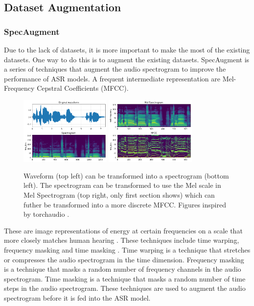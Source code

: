 \documentclass[letterpaper, 12pt]{article}
\begin{document}
\begin{multicols*}{2}
\subsection{Dataset Augmentation}
\subsubsection{SpecAugment}
Due to the lack of datasets, it is more important to make the most of the existing datasets. One
way to do this is to augment the existing datasets. SpecAugment is a series of techniques that
augment the audio spectrogram to improve the performance of ASR models. A frequent intermediate
representation are Mel-Frequency Cepstral Coefficients (MFCC).

\begin{figure}
    \centering
    \includegraphics[width=0.4\textwidth]{assets/waveform-to-spectrogram-sing.png}
    \includegraphics[width=0.4\textwidth]{assets/melspectrogram-mfcc.png}
    \caption{Waveform (top left) can be transformed into a spectrogram (bottom left).
    The spectrogram can be transformed to use the Mel scale in Mel Spectrogram (top right,
    only first section shows) which can futher be transformed into a more discrete MFCC.
    Figures inspired by torchaudio \citep{torchAudioFigures}.}
    \label{fig:MFCC}
\end{figure}

These are image representations of
energy at certain frequencies on a scale that more closely matches human hearing \citep{MFCC}.
These techniques include time warping, frequency masking and time masking \citep{SpecAugment}.
Time warping is a technique that stretches or compresses the audio spectrogram in the time
dimension. Frequency masking is a technique that masks a random number of frequency channels in
the audio spectrogram. Time masking is a technique that masks a random number of time steps
in the audio spectrogram. These techniques are used to augment the audio spectrogram before it
is fed into the ASR model. \citep{SpecAugment}


\end{multicols*}
\end{document}
